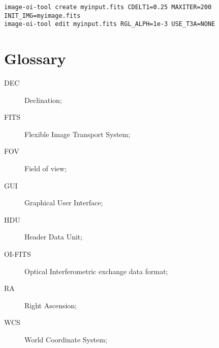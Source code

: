 \documentclass{article}
\begin{document}
\begin{verbatim}
image-oi-tool create myinput.fits CDELT1=0.25 MAXITER=200 INIT_IMG=myimage.fits
image-oi-tool edit myinput.fits RGL_ALPH=1e-3 USE_T3A=NONE
\end{verbatim}

\appendix
\section{Glossary}

\begin{description}
\item[DEC] Declination;
\item[FITS] Flexible Image Transport System;
\item[FOV] Field of view;
\item[GUI] Graphical User Interface;
\item[HDU] Header Data Unit;
\item[OI-FITS] Optical Interferometric exchange data format;
\item[RA] Right Ascension;
\item[WCS] World Coordinate System;
\end{description}



\end{document}

